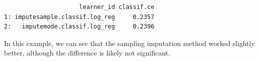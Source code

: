 \begin{Shaded}
\begin{Highlighting}[]
\OtherTok{=} 
\OtherTok{=} \NormalTok{(}\NormalTok{(}\NormalTok{) }\SpecialCharTok{\%\textgreater{}\textgreater{}\%}

\OtherTok{=} \NormalTok{(}\NormalTok{(}\NormalTok{), }
  \NormalTok{(}\NormalTok{, } \NormalTok{))}
\OtherTok{=} 
\OtherTok{=}\SpecialCharTok{$}
\end{Highlighting}
\end{Shaded}

\begin{verbatim}
                     learner_id classif.ce
1: imputesample.classif.log_reg     0.2357
2:   imputemode.classif.log_reg     0.2396
\end{verbatim}

In this example, we can see that the sampling imputation method worked
slightly better, although the difference is likely not significant.

